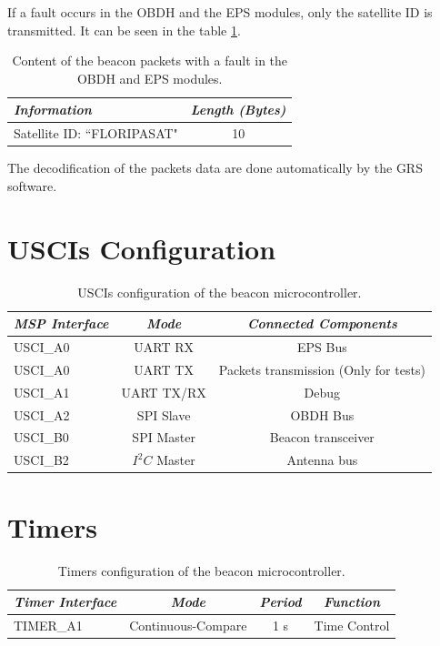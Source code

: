 If a fault occurs in the OBDH and the EPS modules, only the satellite ID is transmitted. It can be seen in the table \ref{tab:beacon-without-eps-payload}.

\begin{table}[!h]
	\begin{center}
		\begin{tabular}{lc}
			\toprule[1.5pt]
			\textit{Information} & \textit{Length (Bytes)} \\
			\midrule
			Satellite ID: ``FLORIPASAT" & 10 \\
			\bottomrule[1.5pt]
		\end{tabular}
		\caption{Content of the beacon packets with a fault in the OBDH and EPS modules.}
		\label{tab:beacon-without-eps-payload}
	\end{center}
\end{table}

The decodification of the packets data are done automatically by the GRS software.

\section{USCIs Configuration}

\begin{table}[!h]
	\begin{center}
		\begin{tabular}{lcc}
			\toprule[1.5pt]
			\textit{MSP Interface} & \textit{Mode} & \textit{Connected Components} \\
			\midrule
			USCI\_A0 & UART RX & EPS Bus \\
			USCI\_A0 & UART TX & Packets transmission (Only for tests) \\
			USCI\_A1 & UART TX/RX & Debug \\
			USCI\_A2 & SPI Slave & OBDH Bus \\
			USCI\_B0 & SPI Master & Beacon transceiver \\
			USCI\_B2 & $I^{2}C$ Master & Antenna bus  \\
			\bottomrule[1.5pt]
		\end{tabular}
		\caption{USCIs configuration of the beacon microcontroller.}
		\label{tab:beacon-uc-usci-config}
	\end{center}
\end{table}

\section{Timers}

\begin{table}[!h]
	\begin{center}
		\begin{tabular}{lccc}
			\toprule[1.5pt]
			\textit{Timer Interface} & \textit{Mode} & \textit{Period} & \textit{Function} \\
			\midrule
			TIMER\_A1 & Continuous-Compare & 1 s & Time Control \\
			\bottomrule[1.5pt]
		\end{tabular}
		\caption{Timers configuration of the beacon microcontroller.}
		\label{tab:beacon-uc-timers-config}
	\end{center}
\end{table}
